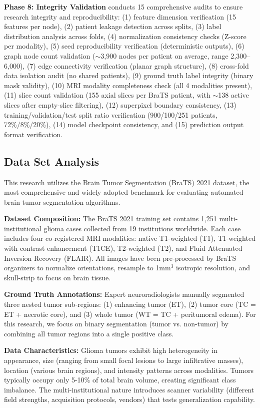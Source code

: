 \textbf{Phase 8: Integrity Validation} conducts 15 comprehensive audits to ensure research integrity and reproducibility: (1) feature dimension verification (15 features per node), (2) patient leakage detection across splits, (3) label distribution analysis across folds, (4) normalization consistency checks (Z-score per modality), (5) seed reproducibility verification (deterministic outputs), (6) graph node count validation ($\sim$3,900 nodes per patient on average, range 2,300--6,000), (7) edge connectivity verification (planar graph structure), (8) cross-fold data isolation audit (no shared patients), (9) ground truth label integrity (binary mask validity), (10) MRI modality completeness check (all 4 modalities present), (11) slice count validation (155 axial slices per BraTS patient, with $\sim$138 active slices after empty-slice filtering), (12) superpixel boundary consistency, (13) training/validation/test split ratio verification (900/100/251 patients, 72\%/8\%/20\%), (14) model checkpoint consistency, and (15) prediction output format verification.


\subsection{Data Set Analysis}

This research utilizes the Brain Tumor Segmentation (BraTS) 2021 dataset, the most comprehensive and widely adopted benchmark for evaluating automated brain tumor segmentation algorithms.

\textbf{Dataset Composition:} The BraTS 2021 training set contains 1,251 multi-institutional glioma cases collected from 19 institutions worldwide. Each case includes four co-registered MRI modalities: native T1-weighted (T1), T1-weighted with contrast enhancement (T1CE), T2-weighted (T2), and Fluid Attenuated Inversion Recovery (FLAIR). All images have been pre-processed by BraTS organizers to normalize orientations, resample to 1mm$^3$ isotropic resolution, and skull-strip to focus on brain tissue.

\textbf{Ground Truth Annotations:} Expert neuroradiologists manually segmented three nested tumor sub-regions: (1) enhancing tumor (ET), (2) tumor core (TC = ET + necrotic core), and (3) whole tumor (WT = TC + peritumoral edema). For this research, we focus on binary segmentation (tumor vs. non-tumor) by combining all tumor regions into a single positive class.

\textbf{Data Characteristics:} Glioma tumors exhibit high heterogeneity in appearance, size (ranging from small focal lesions to large infiltrative masses), location (various brain regions), and intensity patterns across modalities. Tumors typically occupy only 5-10\% of total brain volume, creating significant class imbalance. The multi-institutional nature introduces scanner variability (different field strengths, acquisition protocols, vendors) that tests generalization capability.

